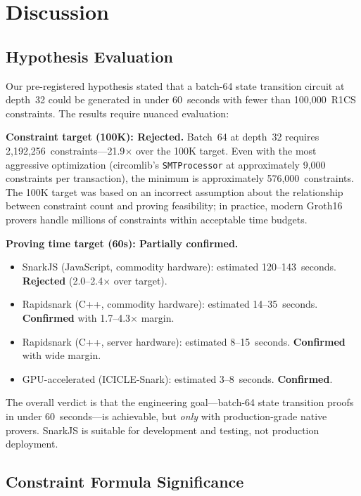 \section{Discussion}

\subsection{Hypothesis Evaluation}

Our pre-registered hypothesis stated that a batch-64 state transition
circuit at depth~32 could be generated in under 60~seconds with fewer
than 100,000~R1CS constraints. The results require nuanced evaluation:

\textbf{Constraint target (100K): Rejected.} Batch~64 at depth~32
requires 2,192,256~constraints---21.9$\times$ over the 100K target.
Even with the most aggressive optimization (circomlib's
\texttt{SMTProcessor} at approximately 9,000 constraints per transaction),
the minimum is approximately 576,000~constraints. The 100K target was
based on an incorrect assumption about the relationship between constraint
count and proving feasibility; in practice, modern Groth16 provers
handle millions of constraints within acceptable time budgets.

\textbf{Proving time target (60s): Partially confirmed.}
\begin{itemize}
\item SnarkJS (JavaScript, commodity hardware): estimated 120--143~seconds.
  \textbf{Rejected} (2.0--2.4$\times$ over target).
\item Rapidsnark (C++, commodity hardware): estimated 14--35~seconds.
  \textbf{Confirmed} with 1.7--4.3$\times$ margin.
\item Rapidsnark (C++, server hardware): estimated 8--15~seconds.
  \textbf{Confirmed} with wide margin.
\item GPU-accelerated (ICICLE-Snark): estimated 3--8~seconds.
  \textbf{Confirmed}.
\end{itemize}

The overall verdict is that the engineering goal---batch-64 state
transition proofs in under 60~seconds---is achievable, but \emph{only}
with production-grade native provers. SnarkJS is suitable for development
and testing, not production deployment.

\subsection{Constraint Formula Significance}

